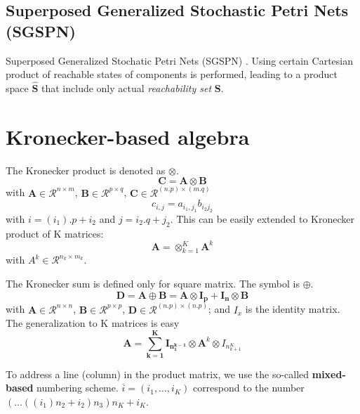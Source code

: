 \subsection{Superposed Generalized Stochastic Petri Nets (SGSPN)}
\label{sec:SGSPN}

Superposed Generalized Stochatic Petri Nets (SGSPN) 
\citep{donatelli1994,kemper1996,kemper1996thesis}. Using certain Cartesian
product of reachable states of components is performed, leading to a product
space $\mathbf{\hat{S}}$ that include only actual {\it reachability set}
$\mathbf{S}$. 


\section{Kronecker-based algebra}
\label{sec:kronecker-based}

The Kronecker product is denoted as $\otimes$.
\begin{equation}
\mathbf{C = A \otimes B}
\end{equation}
with $\mathbf{A}\in \mathcal{R}^{n\times m}$, $\mathbf{B}\in
\mathcal{R}^{p\times q}$, $\mathbf{C}\in \mathcal{R}^{(n.p)\times (m.q)}$
\begin{equation}
c_{i,j} = a_{i_1,j_1}b_{i_2j_2}
\end{equation}
with $i = (i_1).p + i_2$ and $j=i_2.q+j_2$. This can be easily extended to
Kronecker product of K matrices:
\begin{equation}
\mathbf{A} = \otimes^K_{k=1} \mathbf{A}^k
\end{equation}
with $A^k \in \mathcal{R}^{n_k\times m_k}$. 

The Kronecker sum is defined only for square matrix. The symbol is $\oplus$. 
\begin{equation}
\mathbf{D = A \oplus B = A \otimes I_p + I_n \otimes B}
\end{equation}
with $\mathbf{A}\in \mathcal{R}^{n\times n}$, $\mathbf{B}\in
\mathcal{R}^{p\times p}$, $\mathbf{D}\in \mathcal{R}^{(n.p)\times (n.p)}$; and
$I_x$ is the identity matrix. The generalization to K matrices is easy
\begin{equation}
\mathbf{A = \sum_{k=1}^K I_{n_1^{k-1}}} \otimes \mathbf{A}^k \otimes
I_{n^K_{k+1}}
\end{equation} 


\begin{framed}
To address a line (column) in the product matrix, we use the so-called {\bf
mixed-based} numbering scheme. $\overline{i}=(i_1,\ldots,i_K)$ correspond to the
number $(\ldots((i_1)n_2 + i_2)n_3)n_K+ i_K$. 
\end{framed}


